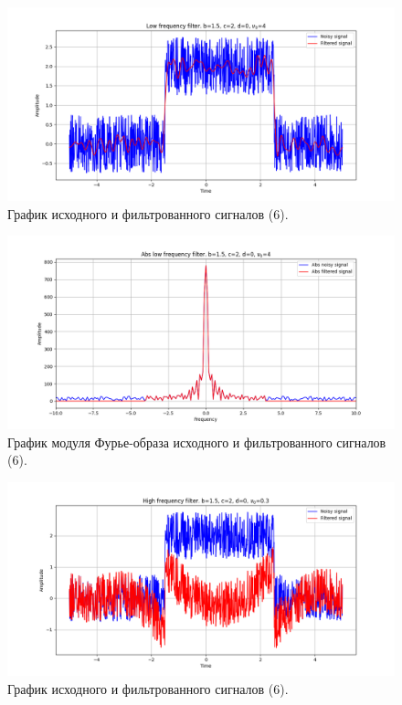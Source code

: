 \documentclass[a4paper, 12pt]{article}
\begin{document}
    \begin{figure}[H]
        \centering
        \includegraphics[scale=0.48]{6_1_u_flt_u_nospec.png}
        \captionsetup{skip=0pt}
        \caption{График исходного и фильтрованного сигналов (6).}
        \label{fig:skljfgf}
    \end{figure}
    \begin{figure}[!htb]
        \centering
        \includegraphics[scale=0.48]{6_1_abs_u_U_nospec.png}
        \captionsetup{skip=0pt}
        \caption{График модуля Фурье-образа исходного и фильтрованного сигналов (6).}
        \label{fig:jkfjdls4}
    \end{figure}
    \begin{figure}[!htb]
        \centering
        \includegraphics[scale=0.48]{6_2_u_flt_u_nospec.png}
        \captionsetup{skip=0pt}
        \caption{График исходного и фильтрованного сигналов (6).}
        \label{fig:83242}
    \end{figure}
\end{document}
